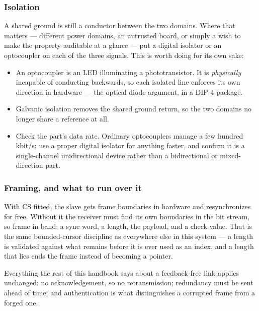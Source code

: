 \documentclass[11pt,a4paper]{article}
\begin{document}
\subsubsection{Isolation}

A shared ground is still a conductor between the two domains. Where that
matters --- different power domains, an untrusted \srcside{} board, or simply a
wish to make the property auditable at a glance --- put a digital isolator or
an optocoupler on each of the three signals. This is worth doing for its own
sake:

\begin{itemize}
\item An optocoupler is an LED illuminating a phototransistor. It is
      \emph{physically} incapable of conducting backwards, so each isolated
      line enforces its own direction in hardware --- the optical diode
      argument, in a DIP-4 package.
\item Galvanic isolation removes the shared ground return, so the two domains
      no longer share a reference at all.
\item Check the part's data rate. Ordinary optocouplers manage a few hundred
      kbit/s; use a proper digital isolator for anything faster, and confirm
      it is a single-channel unidirectional device rather than a
      bidirectional or mixed-direction part.
\end{itemize}

\subsubsection{Framing, and what to run over it}

With CS fitted, the slave gets frame boundaries in hardware and resynchronizes
for free. Without it the receiver must find its own boundaries in the bit
stream, so frame in band: a sync word, a length, the payload, and a check
value. That is the same bounded-cursor discipline as everywhere else in this
system --- a length is validated against what remains before it is ever used as
an index, and a length that lies ends the frame instead of becoming a pointer.

Everything the rest of this handbook says about a feedback-free link applies
unchanged: no acknowledgement, so no retransmission; redundancy must be sent
ahead of time; and authentication is what distinguishes a corrupted frame from
a forged one.
\end{document}
